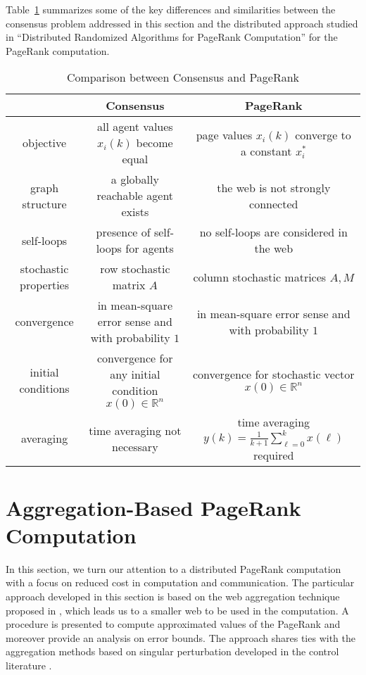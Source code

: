 \documentclass[11pt,draftcls,onecolumn]{IEEEtran}
\newcommand{\field}[1]{{\mathbb{#1}}}
\newcommand{\R}{\field{R}}
\begin{document}
\medskip



Table~\ref{consensusandpagerank}
summarizes some of the key differences and similarities between the consensus
problem addressed in this section and the distributed approach studied 
in ``Distributed Randomized Algorithms for PageRank Computation''
for the PageRank computation.




\begin{table}[htb]
\caption{Comparison between Consensus and PageRank}
\label{consensusandpagerank}
\begin{tabular}{|c|c|c|} \hline
& Consensus & PageRank \\ \hline
objective & all agent values $x_i(k)$ become equal & page values $x_i(k)$ converge to a constant $x_i^*$\\
graph structure & a globally reachable agent exists & the web is not strongly connected \\
self-loops & presence of self-loops for agents & no self-loops are considered in the web\\
stochastic properties &row stochastic matrix $A$ & column stochastic matrices $A, M$\\
convergence & in mean-square error sense and with probability $1$ & in mean-square error sense
and with probability $1$
\\
initial conditions & convergence for any initial condition  $x(0) \in \R^n$ & convergence for stochastic vector $x(0) \in \R^n$\\
averaging & time averaging not necessary & time averaging $y(k)= \frac{1}{k+1}\sum_{\ell=0}^{k} x(\ell)$ required \\
\hline
\end{tabular}
\end{table}


\section*{Aggregation-Based PageRank Computation}

In this section, we turn our attention to a distributed PageRank computation
with a focus on reduced cost in computation and communication.
The particular approach developed in this section 
is based on the web aggregation technique proposed in 
\cite{IshTemBai:12}, which
leads us to a smaller web to be used in the computation. 
A procedure is presented to compute approximated values of the
PageRank and moreover provide an analysis on error bounds.
The approach shares ties with the
aggregation methods based on singular perturbation 
developed in the control literature \cite{PhiKok:81}.
\end{document}
